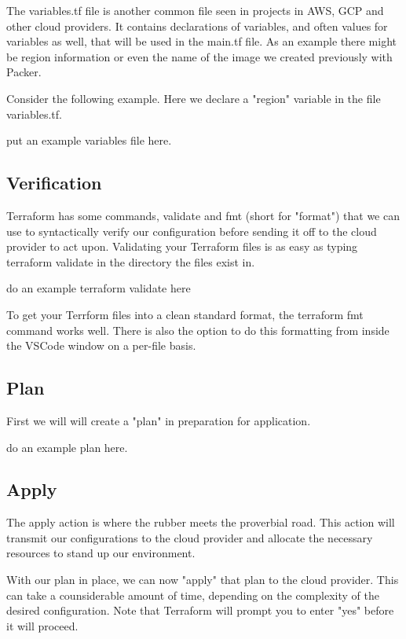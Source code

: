 \justify
The variables.tf file is another common file seen in projects in AWS,
GCP and other cloud providers. It contains declarations of variables,
and often values for variables as well, that will be used in the main.tf
file. As an example there might be region information or even the name
of the image we created previously with Packer.

\justify
Consider the following example. Here we declare a "region" variable in
the file variables.tf.

put an example variables file here.

\subsection{Verification}

\justify
Terraform has some commands, validate and fmt (short for "format") that
we can use to syntactically verify our configuration before sending it
off to the cloud provider to act upon. Validating your Terraform files
is as easy as typing terraform validate in the directory the files exist
in.

do an example terraform validate here

To get your Terrform files into a clean standard format, the
terraform fmt command works well. There is also the option to do this
formatting from inside the VSCode window on a per-file basis.

\subsection{Plan}

First we will will create a "plan" in preparation for application.

do an example plan here.

\subsection{Apply}

The apply action is where the rubber meets the proverbial road. This
action will transmit our configurations to the cloud provider and
allocate the necessary resources to stand up our environment.

With our plan in place, we can now "apply" that plan to the cloud
provider. This can take a counsiderable amount of time, depending on the
complexity of the desired configuration. Note that Terraform will prompt
you to enter "yes" before it will proceed.

